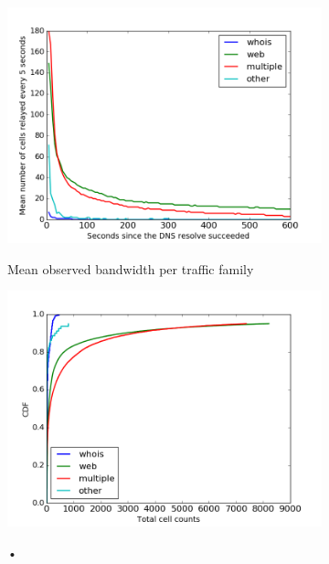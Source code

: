 \begin{figure}
	\centering
	\begin{subfigure}[t]{0.32\textwidth}
		\centering
		\includegraphics[scale=0.3]{images/exitmeasurement.png}
		\label{fig:stats_a}
		\caption{Mean observed bandwidth per traffic family}
	\end{subfigure}
	\begin{subfigure}[t]{0.32\textwidth}
		\centering
		\includegraphics[scale=0.3]{images/totcellcountscdf.png}
		\label{fig:stats_b}
		\caption{•}
	\end{subfigure}
	\begin{subfigure}[t]{0.32\textwidth}
		\centering

\end{subfigure}
\end{figure}
